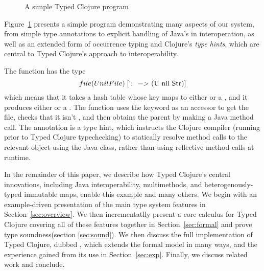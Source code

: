 \begin{figure}
\inputminted[firstline=5,lastline=8]{clojure}{code/demo/src/demo/parent2.clj}
\caption{A simple Typed Clojure program}
\label{fig:ex1}
\end{figure}

Figure~\ref{fig:ex1} presents a simple program demonstrating many
aspects of our system, from simple type annotations to explicit
handling of Java's  in interoperation, as well as an
extended form of occurrence typing and Clojure's \emph{type hints},
which are central to Typed Clojure's approach to interoperability. 

The  function has the type 
$$
\clj{['{:file (U nil File)} -> (U nil Str)]}
$$
which means that it takes a hash table whose  key maps to either
 or a , and it produces either  or a
. The  function uses the  keyword
as an accessor to get the file, checks that it isn't , and
then obtains the parent by making a Java method call.
%
The annotation  is a type hint, which instructs the Clojure
compiler (running prior to Typed Clojure typechecking) to statically
resolve method calls to the relevant object using the Java 
class, rather than using reflective method calls at runtime.

In the remainder of this paper, we describe how Typed Clojure's
central innovations, including Java interoperability, multimethods,
and heterogenously-typed immutable maps, enable this example and many
others. We begin with an example-driven presentation of the main type
system features in Section~\ref{sec:overview}. We then incrementatlly
present a core calculus for Typed Clojure covering all of these
features together in Section~\ref{sec:formal} and prove type
soundness(section \ref{sec:sound}). We then discuss the full
implementation of Typed Clojure, dubbed \coretyped{}, which extends
the formal model in many ways, and the experience gained from its use
in Section~\ref{sec:exp}. Finally, we discuss related work and
conclude.



